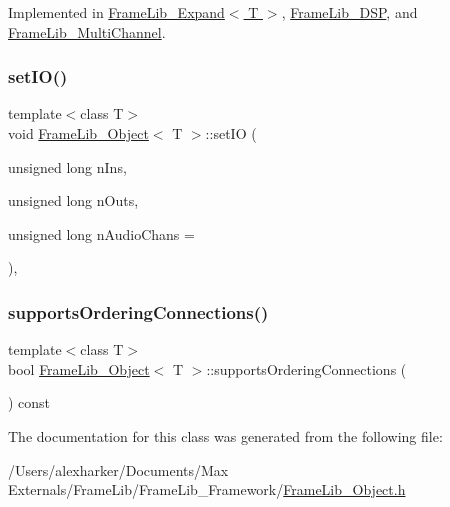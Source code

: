 Implemented in \hyperlink{class_frame_lib___expand_a73f7bf4264d45f56f249d6303b3e4c35}{Frame\+Lib\+\_\+\+Expand$<$ T $>$}, \hyperlink{class_frame_lib___d_s_p_ad15333614446257796e75db254efac78}{Frame\+Lib\+\_\+\+D\+SP}, and \hyperlink{class_frame_lib___multi_channel_a2bbd1050ff53556bf671282312857301}{Frame\+Lib\+\_\+\+Multi\+Channel}.

\mbox{\label{class_frame_lib___object_a5c34227ace795af7da847fff3f2b300d}} 
\subsubsection{\texorpdfstring{set\+I\+O()}{setIO()}}
{\footnotesize\ttfamily template$<$class T$>$ \\
void \hyperlink{class_frame_lib___object}{Frame\+Lib\+\_\+\+Object}$<$ T $>$\+::set\+IO (\begin{DoxyParamCaption}\item[{unsigned long}]{n\+Ins,  }\item[{unsigned long}]{n\+Outs,  }\item[{unsigned long}]{n\+Audio\+Chans = {} }\end{DoxyParamCaption})\hspace{0.3cm}{\ttfamily [inline]}, {\ttfamily [protected]}}

\mbox{\label{class_frame_lib___object_a0f0baead3c4ca259a6b4e7a417f45735}} 
\subsubsection{\texorpdfstring{supports\+Ordering\+Connections()}{supportsOrderingConnections()}}
{\footnotesize\ttfamily template$<$class T$>$ \\
bool \hyperlink{class_frame_lib___object}{Frame\+Lib\+\_\+\+Object}$<$ T $>$\+::supports\+Ordering\+Connections (\begin{DoxyParamCaption}{ }\end{DoxyParamCaption}) const\hspace{0.3cm}{\ttfamily [inline]}}



The documentation for this class was generated from the following file\+:\begin{DoxyCompactItemize}
\item 
/\+Users/alexharker/\+Documents/\+Max Externals/\+Frame\+Lib/\+Frame\+Lib\+\_\+\+Framework/\hyperlink{_frame_lib___object_8h}{Frame\+Lib\+\_\+\+Object.\+h}\end{DoxyCompactItemize}
